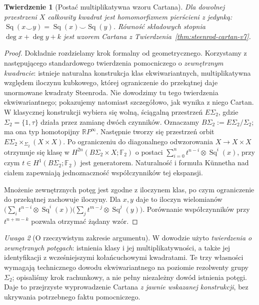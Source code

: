 \documentclass[11pt,a4paper,oneside]{report}
\newcommand{\F}{\mathbb{F}}
\newcommand{\R}{\mathbb{R}}
\theoremstyle{plain}
\newtheorem{twierdzenie}{Twierdzenie}[section]
\theoremstyle{definition}
\theoremstyle{remark}
\newtheorem{uwaga}[twierdzenie]{Uwaga}
\begin{document}
\begin{twierdzenie}[Postać multiplikatywna wzoru Cartana]
\label{thm:cartan-v8}
Dla dowolnej przestrzeni $X$ całkowity kwadrat jest
homomorfizmem pierścieni z jedynką:
$\operatorname{Sq}(x\smile y)=\operatorname{Sq}(x)\smile\operatorname{Sq}(y)$.
Równość składowych stopnia $\deg x+\deg y+k$ jest
wzorem Cartana z Twierdzenia~\ref{thm:steenrod-cartan-v7}.
\end{twierdzenie}
\begin{proof}
Dokładnie rozdzielamy krok formalny od geometrycznego.
Korzystamy z następującego standardowego twierdzenia
pomocniczego o \emph{zewnętrznym kwadracie}: istnieje
naturalna konstrukcja klas ekwiwariantnych, multiplikatywna
względem iloczynu kubkowego, której ograniczenie do
przekątnej daje unormowane kwadraty Steenroda.
Nie dowodzimy tu tego twierdzenia ekwiwariantnego;
pokazujemy natomiast szczegółowo, jak wynika z niego Cartan.
W klasycznej konstrukcji wybiera się wolną, ściągalną
przestrzeń $E\Sigma_2$, gdzie
$\Sigma_2=\{1,\tau\}$ działa przez zamianę dwóch czynników.
Oznaczamy $B\Sigma_2:=E\Sigma_2/\Sigma_2$;
ma ona typ homotopijny $\R P^\infty$.
Następnie tworzy się przestrzeń orbit
$E\Sigma_2\times_{\Sigma_2}(X\times X)$.
Po ograniczeniu do diagonalnego odwzorowania
$X\to X\times X$ otrzymuje się klasę w
$H^{2n}(B\Sigma_2\times X;\F_2)$ o postaci
$\sum_{i=0}^n t^{n-i}\otimes\operatorname{Sq}^i(x)$,
przy czym $t\in H^1(B\Sigma_2;\F_2)$ jest generatorem.
Naturalność i formuła Künnetha nad ciałem zapewniają jednoznaczność
współczynników tej ekspansji.

Mnożenie zewnętrznych potęg jest zgodne z iloczynem klas,
po czym ograniczenie do przekątnej zachowuje iloczyny.
Dla $x,y$ daje to iloczyn wielomianów
$\bigl(\sum_i t^{n-i}\otimes\operatorname{Sq}^i(x)\bigr)
 \bigl(\sum_j t^{m-j}\otimes\operatorname{Sq}^j(y)\bigr)$.
Porównanie współczynników przy $t^{n+m-k}$
pozwala otrzymać żądany wzór.
\end{proof}
\begin{uwaga}[O rzeczywistym zakresie argumentu]
W dowodzie użyto \emph{twierdzenia o zewnętrznych potęgach}:
istnienia klasy i jej multiplikatywności, a także jej
identyfikacji z wcześniejszymi kołańcuchowymi kwadratami.
Te trzy własności wymagają technicznego dowodu ekwiwariantnego
na poziomie rezolwenty grupy $\Sigma_2$; opisaliśmy krok rachunkowy,
a nie pełny niezależny dowód istnienia potęgi. Daje to przejrzyste
wyprowadzenie Cartana \emph{z jawnie wskazanej konstrukcji},
bez ukrywania potrzebnego faktu pomocniczego.
\end{uwaga}
\end{document}
